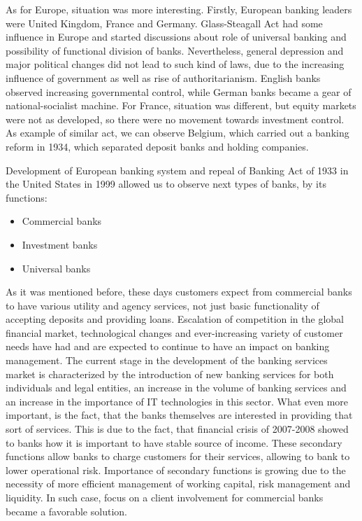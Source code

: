 As for Europe, situation was more interesting. Firstly, European banking leaders were United Kingdom, France and Germany. Glass-Steagall Act had some influence in Europe and started discussions about role of universal banking and possibility of functional division of banks. Nevertheless, general depression and major political changes did not lead to such kind of laws, due to the increasing influence of government as well as rise of authoritarianism. English banks observed increasing governmental control, while German banks became a gear of national-socialist machine. For France, situation was different, but equity markets were not as developed, so there were no movement towards investment control. As example of similar act, we can observe Belgium, which carried out a banking reform in 1934, which separated deposit banks and holding companies.

Development of European banking system and repeal of Banking Act of 1933 in the United States in 1999 allowed us to observe next types of banks, by its functions:

\begin{itemize}
    \item Commercial banks
    \item Investment banks
    \item Universal banks
\end{itemize}	

As it was mentioned before, these days customers expect from commercial banks to have various utility and agency services, not just basic functionality of accepting deposits and providing loans. Escalation of competition in the global financial market, technological changes and ever-increasing variety of customer needs have had and are expected to continue to have an impact on banking management. The current stage in the development of the banking services market is characterized by the introduction of new banking services for both individuals and legal entities, an increase in the volume of banking services and an increase in the importance of IT technologies in this sector. 
What even more important, is the fact, that the banks themselves are interested in providing that sort of services. This is due to the fact, that financial crisis of 2007-2008 showed to banks how it is important to have stable source of income. These secondary functions allow banks to charge customers for their services, allowing to bank to lower operational risk. Importance of secondary functions is growing due to the necessity of more efficient management of working capital, risk management and liquidity. 
In such case, focus on a client involvement for commercial banks became a favorable solution.

